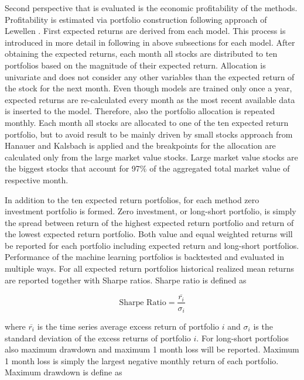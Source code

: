 \documentclass{article}
\begin{document}
Second perspective that is evaluated is the economic profitability of the methods. Profitability is estimated via portfolio construction following approach of Lewellen \citeyear{Lewellen2015}. First expected returns are derived from each model. This process is introduced in more detail in following in above subsections for each model. After obtaining the expected returns, each month all stocks are distributed to ten portfolios based on the magnitude of their expected return. Allocation is univariate and does not consider any other variables than the expected return of the stock for the next month. Even though models are trained only once a year, expected returns are re-calculated every month as the most recent available data is inserted to the model. Therefore, also the portfolio allocation is repeated monthly. Each month all stocks are allocated to one of the ten expected return portfolio, but to avoid result to be mainly driven by small stocks approach from Hanauer and Kalsbach is applied \citeyear{HANAUER2023} and the breakpoints for the allocation are calculated only from the large market value stocks. Large market value stocks are the biggest stocks that account for 97\% of the aggregated total market value of respective month. \par

In addition to the ten expected return portfolios, for each method zero investment portfolio is formed. Zero investment, or long-short portfolio, is simply the spread between return of the highest expected return portfolio and return of the lowest expected return portfolio. Both value and equal weighted returns will be reported for each portfolio including expected return and long-short portfolios. Performance of the machine learning portfolios is backtested and evaluated in multiple ways. For all expected return portfolios historical realized mean returns are reported together with Sharpe ratios. Sharpe ratio is defined as

\begin{equation}
\label{eq:SharpeRatio}
\text{Sharpe Ratio} = \frac{\overline{r_i}}{\sigma_i}
\end{equation}

where $\overline{r_i}$ is the time series average excess return of portfolio $i$ and $\sigma_i$ is the standard deviation of the excess returns of portfolio $i$. For long-short portfolios also maximum drawdown and maximum 1 month loss will be reported. Maximum 1 month loss is simply the largest negative monthly return of each portfolio. Maximum drawdown is define as \par
\end{document}
